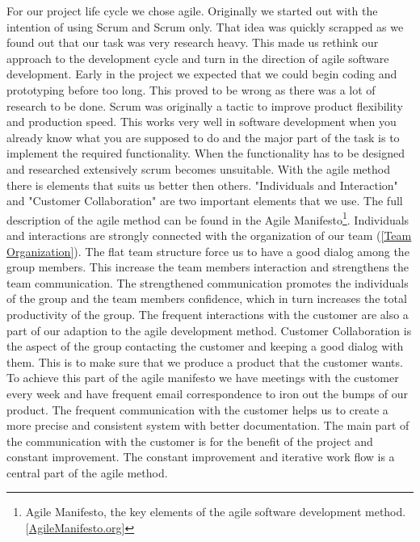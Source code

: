     For our project life cycle we chose agile. Originally we started out with the intention of using Scrum and Scrum only. That idea was quickly scrapped as we found out that our task was very research heavy. This made us rethink our approach to the development cycle and turn in the direction of agile software development.
    Early in the project we expected that we could begin coding and prototyping before too long. This proved to be wrong as there was a lot of research to be done. Scrum was originally a tactic to improve product flexibility and production speed. This works very well in software development when you already know what you are supposed to do and the major part of the task is to implement the required functionality. When the functionality has to be designed and researched extensively scrum becomes unsuitable. 
    With the agile method there is elements that suits us better then others. "Individuals and Interaction" and "Customer Collaboration" are two important elements that we use. The full description of the agile method can be found in the Agile Manifesto\footnote
        {Agile Manifesto, the key elements of the agile software development method. [\href{http://http://agilemanifesto.org/}{AgileManifesto.org}]}.
    Individuals and interactions are strongly connected with the organization of our team (\ref{Team Organization}). The flat team structure force us to have a good dialog among the group members. This increase the team members interaction and strengthens the team communication. The strengthened communication promotes the individuals of the group and the team members confidence, which in turn increases the total productivity of the group. The frequent interactions with the customer are also a part of our adaption to the agile development method. 
    Customer Collaboration is the aspect of the group contacting the customer and keeping a good dialog with them. This is to make sure that we produce a product that the customer wants. To achieve this part of the agile manifesto we have meetings with the customer every week and have frequent email correspondence to iron out the bumps of our product. The frequent communication with the customer helps us to create a more precise and consistent system with better documentation. The main part of the communication with the customer is for the benefit of the project and constant improvement. The constant improvement and iterative work flow is a central part of the agile method. 

